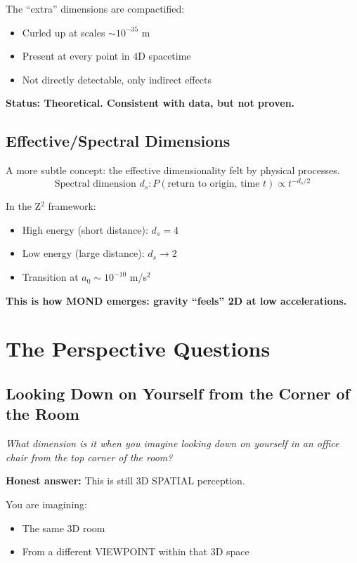 \documentclass[12pt,a4paper]{article}
\begin{document}
The ``extra'' dimensions are compactified:
\begin{itemize}
\item Curled up at scales $\sim 10^{-35}$ m
\item Present at every point in 4D spacetime
\item Not directly detectable, only indirect effects
\end{itemize}

\textbf{Status: Theoretical. Consistent with data, but not proven.}

\subsection{Effective/Spectral Dimensions}

A more subtle concept: the effective dimensionality felt by physical processes.
\begin{equation}
\text{Spectral dimension } d_s: P(\text{return to origin, time } t) \propto t^{-d_s/2}
\end{equation}

In the Z$^2$ framework:
\begin{itemize}
\item High energy (short distance): $d_s = 4$
\item Low energy (large distance): $d_s \rightarrow 2$
\item Transition at $a_0 \sim 10^{-10}$ m/s$^2$
\end{itemize}

\textbf{This is how MOND emerges: gravity ``feels'' 2D at low accelerations.}

\section{The Perspective Questions}

\subsection{Looking Down on Yourself from the Corner of the Room}

\textit{What dimension is it when you imagine looking down on yourself in an office chair from the top corner of the room?}

\textbf{Honest answer:} This is still 3D SPATIAL perception.

You are imagining:
\begin{itemize}
\item The same 3D room
\item From a different VIEWPOINT within that 3D space
\end{itemize}
\end{document}
